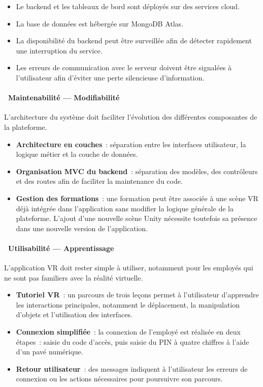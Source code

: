 \begin{itemize}
  \item Le backend et les tableaux de bord sont déployés sur des services cloud.
  \item La base de données est hébergée sur MongoDB Atlas.
  \item La disponibilité du backend peut être surveillée afin de détecter rapidement
    une interruption du service.
  \item Les erreurs de communication avec le serveur doivent être signalées à
    l'utilisateur afin d'éviter une perte silencieuse d'information.
\end{itemize}

\paragraph*{\textbullet~Maintenabilité --- Modifiabilité}

L'architecture du système doit faciliter l'évolution des différentes composantes
de la plateforme.

\begin{itemize}
  \item \textbf{Architecture en couches}~: séparation entre les interfaces utilisateur,
    la logique métier et la couche de données.
  \item \textbf{Organisation MVC du backend}~: séparation des modèles, des contrôleurs
    et des routes afin de faciliter la maintenance du code.
  \item \textbf{Gestion des formations}~: une formation peut être associée à une
    scène VR déjà intégrée dans l'application sans modifier la logique générale
    de la plateforme. L'ajout d'une nouvelle scène Unity nécessite toutefois sa
    présence dans une nouvelle version de l'application.
\end{itemize}

\paragraph*{\textbullet~Utilisabilité --- Apprentissage}

L'application VR doit rester simple à utiliser, notamment pour les employés qui
ne sont pas familiers avec la réalité virtuelle.

\begin{itemize}
  \item \textbf{Tutoriel VR}~: un parcours de trois leçons permet à l'utilisateur
    d'apprendre les interactions principales, notamment le déplacement,
    la manipulation d'objets et l'utilisation des interfaces.
  \item \textbf{Connexion simplifiée}~: la connexion de l'employé est réalisée
    en deux étapes~: saisie du code d'accès, puis saisie du PIN à quatre chiffres
    à l'aide d'un pavé numérique.
  \item \textbf{Retour utilisateur}~: des messages indiquent à l'utilisateur
    les erreurs de connexion ou les actions nécessaires pour poursuivre son parcours.
\end{itemize}

